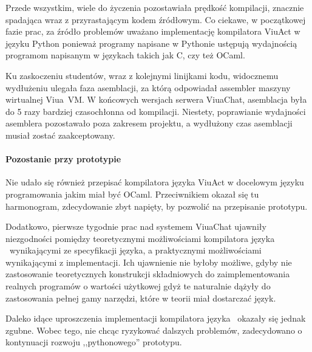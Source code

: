 Przede wszystkim, wiele do życzenia pozostawiała prędkość kompilacji, znacznie
spadająca wraz z przyrastającym kodem źródłowym. Co ciekawe, w początkowej fazie
prac, za źródło problemów uważano implementację kompilatora ViuAct w języku
Python ponieważ programy napisane w Pythonie ustępują wydajnością programom
napisanym w językach takich jak C, czy też OCaml.

Ku zaskoczeniu studentów, wraz z kolejnymi linijkami kodu, widocznemu wydłużeniu
ulegała faza asemblacji, za którą odpowiadał assembler maszyny wirtualnej
Viua~VM. W końcowych wersjach serwera ViuaChat, asemblacja była do 5 razy
bardziej czasochłonna od kompilacji. Niestety, poprawianie wydajności asemblera
pozostawało poza zakresem projektu, a wydłużony czas asemblacji musiał zostać
zaakceptowany.

\paragraph*{Pozostanie przy prototypie}

Nie udało się również przepisać kompilatora języka ViuAct w docelowym języku
programowania jakim miał być OCaml. Przeciwnikiem okazał się tu harmonogram,
zdecydowanie zbyt napięty, by pozwolić na przepisanie prototypu.

Dodatkowo, pierwsze tygodnie prac nad systemem ViuaChat ujawniły niezgodności
pomiędzy teoretycznymi możliwościami kompilatora języka \ViuAct\ wynikającymi ze
specyfikacji języka, a praktycznymi możliwościami wynikającymi z implementacji.
Ich ujawnienie nie byłoby możliwe, gdyby nie zastosowanie teoretycznych
konstrukcji składniowych do zaimplementowania realnych programów o wartości
użytkowej gdyż te naturalnie dążyły do zastosowania pełnej gamy narzędzi,
które w teorii miał dostarczać język.

Daleko idące uproszczenia implementacji kompilatora języka \ViuAct\ okazały się
jednak zgubne. Wobec tego, nie chcąc ryzykować dalszych problemów, zadecydowano
o kontynuacji rozwoju ,,pythonowego'' prototypu.
